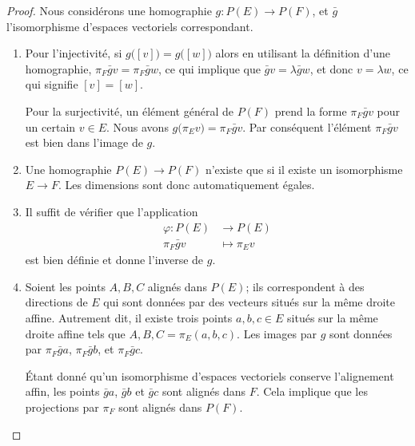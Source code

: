 \begin{proof}
	Nous considérons une homographie \( g\colon P(E)\to P(F)\), et \( \bar g\) l'isomorphisme d'espaces vectoriels correspondant.
	\begin{enumerate}
		\item
		      Pour l'injectivité, si \( g\big( [v] \big)=g\big( [w] \big)\) alors en utilisant la définition d'une homographie, \( \pi_F\bar gv=\pi_F\bar gw\), ce qui implique que \( \bar gv=\lambda\bar gw\), et donc \( v=\lambda w\), ce qui signifie \( [v]=[w]\).

		      Pour la surjectivité, un élément général de \( P(F)\) prend la forme \( \pi_F\bar gv\) pour un certain \( v\in E\). Nous avons \( g\big( \pi_Ev \big)=\pi_F\bar gv\). Par conséquent l'élément \( \pi_F\bar gv\) est bien dans l'image de \( g\).

		\item
		      Une homographie \( P(E)\to P(F)\) n'existe que si il existe un isomorphisme \( E\to F\). Les dimensions sont donc automatiquement égales.
		\item
		      Il suffit de vérifier que l'application
		      \begin{equation}
			      \begin{aligned}
				      \varphi\colon P(E) & \to P(E)       \\
				      \pi_F\bar gv       & \mapsto \pi_Ev
			      \end{aligned}
		      \end{equation}
		      est bien définie et donne l'inverse de \( g\).
		\item
		      Soient les points \( A,B,C\) alignés dans \( P(E)\); ils correspondent à des directions de \( E\) qui sont données par des vecteurs situés sur la même droite affine. Autrement dit, il existe trois points \( a,b,c\in E\) situés sur la même droite affine tels que \( A,B,C=\pi_E(a,b,c)\). Les images par \( g\) sont données par \( \pi_F\bar ga\), \( \pi_F\bar gb\), et \( \pi_F\bar gc\).

		      Étant donné qu'un isomorphisme d'espaces vectoriels conserve l'alignement affin, les points \( \bar ga\), \( \bar gb\) et \( \bar gc\) sont alignés dans \( F\). Cela implique que les projections par \( \pi_F\) sont alignés dans \( P(F)\).
	\end{enumerate}
\end{proof}

